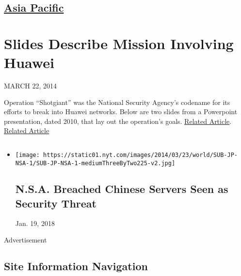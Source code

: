 \hypertarget{-asia-pacific-}{%
\subsection{\texorpdfstring{ \href{/section/world/asia}{Asia Pacific}
}{ Asia Pacific }}\label{-asia-pacific-}}

\hypertarget{slides-describe-mission-involving-huawei}{%
\section{Slides Describe Mission Involving
Huawei}\label{slides-describe-mission-involving-huawei}}

MARCH 22, 2014

Operation ``Shotgiant'' was the National Security Agency's codename for
its efforts to break into Huawei networks. Below are two slides from a
Powerpoint presentation, dated 2010, that lay out the operation's goals.
\href{http://www.nytimes.com/2014/03/23/world/asia/nsa-breached-chinese-servers-seen-as-spy-peril.html}{Related
Article}.
\href{https://www.nytimes.com/2014/03/23/world/asia/nsa-breached-chinese-servers-seen-as-spy-peril.html}{Related
Article}

\subsection{}

\begin{itemize}
\item
  \href{https://www.nytimes.com/2014/03/23/world/asia/nsa-breached-chinese-servers-seen-as-spy-peril.html}{}

  \texttt{[image: https://static01.nyt.com/images/2014/03/23/world/SUB-JP-NSA-1/SUB-JP-NSA-1-mediumThreeByTwo225-v2.jpg]}

  \hypertarget{nsa-breached-chinese-servers-seen-as-security-threat}{%
  \subsection{N.S.A. Breached Chinese Servers Seen as Security
  Threat}\label{nsa-breached-chinese-servers-seen-as-security-threat}}

  Jan. 19, 2018
\end{itemize}

Advertisement

\hypertarget{site-information-navigation}{%
\subsection{Site Information
Navigation}\label{site-information-navigation}}

